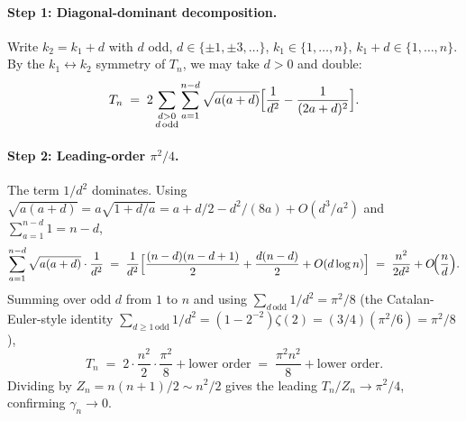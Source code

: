 \documentclass[11pt,a4paper]{article}
\theoremstyle{plain}
\theoremstyle{definition}
\begin{document}
\paragraph{Step 1: Diagonal-dominant decomposition.}
Write $k_2 = k_1 + d$ with $d$ odd, $d \in \{\pm 1, \pm 3, \ldots\}$,
$k_1 \in \{1, \ldots, n\}$, $k_1 + d \in \{1, \ldots, n\}$. By the
$k_1 \leftrightarrow k_2$ symmetry of $T_n$, we may take $d > 0$ and
double:
\begin{equation*}
   T_n \;=\; 2 \sum_{\substack{d > 0 \\ d\,\mathrm{odd}}}
   \sum_{a=1}^{n-d}
   \sqrt{a(a+d)}\Bigl[\frac{1}{d^2} - \frac{1}{(2a+d)^2}\Bigr].
\end{equation*}

\paragraph{Step 2: Leading-order $\pi^2/4$.}
The term $1/d^2$ dominates. Using
$\sqrt{a(a+d)} = a\sqrt{1+d/a} = a + d/2 - d^2/(8a) + O(d^3/a^2)$ and
$\sum_{a=1}^{n-d} 1 = n - d$,
\begin{equation*}
   \sum_{a=1}^{n-d} \sqrt{a(a+d)} \cdot \frac{1}{d^2}
   \;=\; \frac{1}{d^2}\Bigl[\frac{(n-d)(n-d+1)}{2} + \frac{d(n-d)}{2}
   + O(d \log n)\Bigr]
   \;=\; \frac{n^2}{2 d^2} + O\!\Bigl(\frac{n}{d}\Bigr).
\end{equation*}
Summing over odd $d$ from $1$ to $n$ and using
$\sum_{d\,\mathrm{odd}} 1/d^2 = \pi^2 / 8$
(the Catalan-Euler-style identity $\sum_{d\ge 1\,\mathrm{odd}} 1/d^2
= (1 - 2^{-2})\zeta(2) = (3/4)(\pi^2/6) = \pi^2/8$),
\begin{equation*}
   T_n \;=\; 2 \cdot \frac{n^2}{2}\cdot \frac{\pi^2}{8} +
   \text{lower order} \;=\; \frac{\pi^2 n^2}{8} + \text{lower order}.
\end{equation*}
Dividing by $Z_n = n(n+1)/2 \sim n^2/2$ gives the leading
$T_n/Z_n \to \pi^2/4$, confirming $\gamma_n \to 0$.
\end{document}
